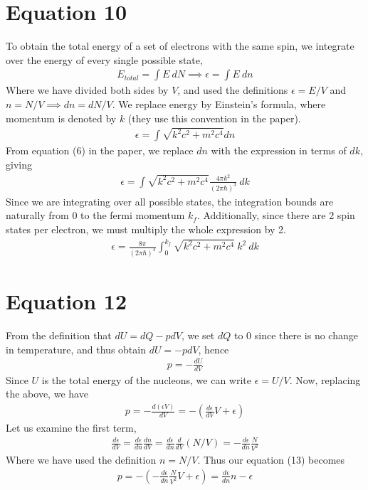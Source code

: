 \documentclass{article}
\begin{document}
\section*{Equation 10}
To obtain the total energy of a set of electrons with the same spin, we integrate over the energy of every single possible state, 
\begin{align}
    E_{total}=\int E\ dN\implies \epsilon=\int E\ dn
\end{align}
Where we have divided both sides by $V$, and used the definitions $\epsilon=E/V$ and $n=N/V\implies dn=dN/V$.
We replace energy by Einstein's formula, where momentum is denoted by $k$ (they use this convention in the paper). 
\begin{align}
    \epsilon=\int\sqrt{k^2c^2+m^2c^4}dn
\end{align}
From equation (6) in the paper, we replace $dn$ with the expression in terms of $dk$, giving 
\begin{align}
    \epsilon=\int \sqrt{k^2c^2+m^2c^4}\frac{4\pi k^2}{(2\pi\hbar)^3}\ dk
\end{align}
Since we are integrating over all possible states, the integration bounds are naturally from 0 to the fermi momentum 
$k_f$. Additionally, since there are 2 spin states per electron, we must multiply the whole expression by 2.
\begin{align}
    \boxed{\epsilon=\frac{8\pi}{(2\pi\hbar)^3}\int_0^{k_f}\sqrt{k^2c^2+m^2c^4}\ k^2\ dk}
\end{align}
\section*{Equation 12}
From the definition that $dU=dQ-pdV$, we set $dQ$ to 0 since there is no change in temperature, 
and thus obtain $dU=-pdV$, hence 
\begin{align}
    p=-\frac{dU}{dV}
\end{align}
Since $U$ is the total energy of the nucleons, we can write $\epsilon=U/V$. Now, replacing the above, we have 
\begin{align}
    p=-\frac{d(\epsilon V)}{dV}=-(\frac{d\epsilon}{dV}V+\epsilon)
\end{align}
Let us examine the first term, 
\begin{align}
    \frac{d\epsilon}{dV}=\frac{d\epsilon}{dn}\frac{dn}{dV}=\frac{d\epsilon}{dn}\frac{d}{dV}(N/V)=-\frac{d\epsilon}{dn}\frac{N}{V^2}
\end{align}
Where we have used the definition $n=N/V$. Thus our equation (13) becomes 
\begin{align}
    p=-(-\frac{d\epsilon}{dn}\frac{N}{V^2}V+\epsilon)=\boxed{\frac{d\epsilon}{dn}n-\epsilon}
\end{align}
\end{document}
